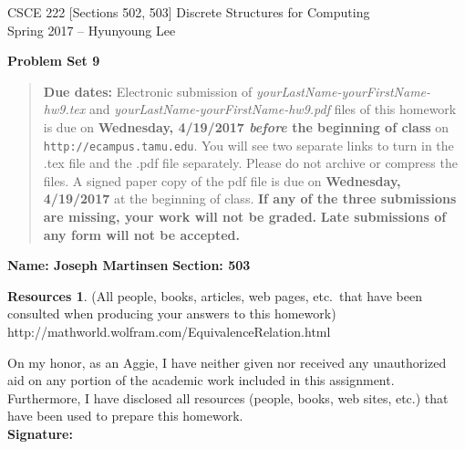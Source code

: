 \documentclass{article}
\theoremstyle{definition}
\newtheorem*{resources}{Resources}
\newcommand{\name}[2]{\noindent\textbf{Name: #1}\hfill \textbf{Section: #2}}
\newcommand{\honor}{\noindent On my honor, as an Aggie, I have neither
  given nor received any unauthorized aid on any portion of the
  academic work included in this assignment. Furthermore, I have
  disclosed all resources (people, books, web sites, etc.) that have
  been used to prepare this homework. \\[2ex]
 \textbf{Signature:} \underline{\hspace*{8cm}} }
\newcommand{\problemset}[1]{\begin{center}\textbf{Problem Set #1}\end{center}}
\newcommand{\duedate}[2]{\begin{quote}\textbf{Due dates:} Electronic
    submission of \textsl{yourLastName-yourFirstName-hw9.tex} and 
    \textsl{yourLastName-yourFirstName-hw9.pdf} files of this homework is due on
    \textbf{#1} on \texttt{http://ecampus.tamu.edu}. You will see two separate links
    to turn in the .tex file and the .pdf file separately. Please do not archive or compress the files.  
    A signed paper copy of the pdf file is due on \textbf{#2} at the beginning of class.
    \textbf{If any of the three submissions are missing, your work will not be graded.}
    \textbf{Late submissions of any form will not be accepted.}\end{quote} }
\begin{document}
\vspace*{-18mm}
\begin{center}
{\large
CSCE 222 [Sections 502, 503] Discrete Structures for Computing\\[.5ex]
Spring 2017 -- Hyunyoung Lee\\}
\end{center}
\problemset{9}
\duedate{Wednesday, 4/19/2017 \textit{before} the beginning of class}{Wednesday, 4/19/2017}
\name{ Joseph Martinsen }{503}
\begin{resources} (All people, books, articles, web pages, etc.\ that
  have been consulted when producing your answers to this homework) \\
  http://mathworld.wolfram.com/EquivalenceRelation.html
\end{resources}
\honor
\end{document}
